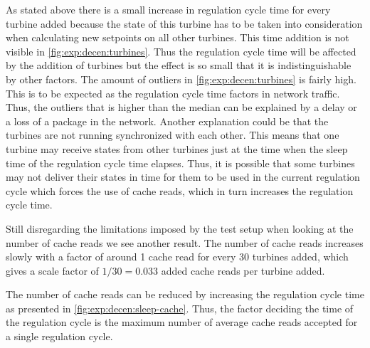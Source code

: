 As stated above there is a small increase in regulation cycle time for every turbine added because the state of this turbine has to be taken into consideration when calculating new setpoints on all other turbines. This time addition is not visible in \cref{fig:exp:decen:turbines}. Thus the regulation cycle time will be affected by the addition of turbines but the effect is so small that it is indistinguishable by other factors.
The amount of outliers in \cref{fig:exp:decen:turbines} is fairly high. This is to be expected as the regulation cycle time factors in network traffic. Thus, the outliers that is higher than the median can be explained by a delay or a loss of a package in the network. Another explanation could be that the turbines are not running synchronized with each other. This means that one turbine may receive states from other turbines just at the time when the sleep time of the regulation cycle time elapses. Thus, it is possible that some turbines may not deliver their states in time for them to be used in the current regulation cycle which forces the use of cache reads, which in turn increases the regulation cycle time.


Still disregarding the limitations imposed by the test setup when looking at the number of cache reads we see another result. The number of cache reads increases slowly with a factor of around 1 cache read for every 30 turbines added, which gives a scale factor of $1 / 30 = 0.033$ added cache reads per turbine added.

The number of cache reads can be reduced by increasing the regulation cycle time as presented in \cref{fig:exp:decen:sleep-cache}.
Thus, the factor deciding the time of the regulation cycle is the maximum number of average cache reads accepted for a single regulation cycle.

\clearpage